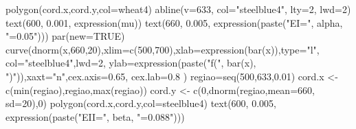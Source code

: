 \documentclass[
  letterpaper,
  DIV=11,
  numbers=noendperiod]{scrartcl}
\newenvironment{Shaded}{\begin{snugshade}}{\end{snugshade}}
\newcommand{\AttributeTok}[1]{\textcolor[rgb]{0.40,0.45,0.13}{#1}}
\newcommand{\ConstantTok}[1]{\textcolor[rgb]{0.56,0.35,0.01}{#1}}
\newcommand{\DecValTok}[1]{\textcolor[rgb]{0.68,0.00,0.00}{#1}}
\newcommand{\FloatTok}[1]{\textcolor[rgb]{0.68,0.00,0.00}{#1}}
\newcommand{\FunctionTok}[1]{\textcolor[rgb]{0.28,0.35,0.67}{#1}}
\newcommand{\NormalTok}[1]{\textcolor[rgb]{0.00,0.23,0.31}{#1}}
\newcommand{\OtherTok}[1]{\textcolor[rgb]{0.00,0.23,0.31}{#1}}
\newcommand{\StringTok}[1]{\textcolor[rgb]{0.13,0.47,0.30}{#1}}
\begin{document}
\begin{Shaded}
\begin{Highlighting}[]
\FunctionTok{polygon}\NormalTok{(cord.x,cord.y,}\AttributeTok{col=}\StringTok{\textquotesingle{}wheat4\textquotesingle{}}\NormalTok{)}
\FunctionTok{abline}\NormalTok{(}\AttributeTok{v=}\DecValTok{633}\NormalTok{, }\AttributeTok{col=}\StringTok{"steelblue4"}\NormalTok{, }\AttributeTok{lty=}\DecValTok{2}\NormalTok{, }\AttributeTok{lwd=}\DecValTok{2}\NormalTok{)}
\FunctionTok{text}\NormalTok{(}\DecValTok{600}\NormalTok{, }\FloatTok{0.001}\NormalTok{, }\FunctionTok{expression}\NormalTok{(mu))}
\FunctionTok{text}\NormalTok{(}\DecValTok{660}\NormalTok{, }\FloatTok{0.005}\NormalTok{, }\FunctionTok{expression}\NormalTok{(}\FunctionTok{paste}\NormalTok{(}\StringTok{"EI="}\NormalTok{, alpha, }\StringTok{"=0.05"}\NormalTok{)))}
\FunctionTok{par}\NormalTok{(}\AttributeTok{new=}\ConstantTok{TRUE}\NormalTok{)}
\FunctionTok{curve}\NormalTok{(}\FunctionTok{dnorm}\NormalTok{(x,}\DecValTok{660}\NormalTok{,}\DecValTok{20}\NormalTok{),}\AttributeTok{xlim=}\FunctionTok{c}\NormalTok{(}\DecValTok{500}\NormalTok{,}\DecValTok{700}\NormalTok{),}\AttributeTok{xlab=}\FunctionTok{expression}\NormalTok{(}\FunctionTok{bar}\NormalTok{(x)),}\AttributeTok{type=}\StringTok{"l"}\NormalTok{,}
      \AttributeTok{col=}\StringTok{"steelblue4"}\NormalTok{,}\AttributeTok{lwd=}\DecValTok{2}\NormalTok{, }\AttributeTok{ylab=}\FunctionTok{expression}\NormalTok{(}\FunctionTok{paste}\NormalTok{(}\StringTok{"f("}\NormalTok{, }\FunctionTok{bar}\NormalTok{(x),}
      \StringTok{")"}\NormalTok{)),}\AttributeTok{xaxt=}\StringTok{"n"}\NormalTok{,}\AttributeTok{cex.axis=}\FloatTok{0.65}\NormalTok{, }\AttributeTok{cex.lab=}\FloatTok{0.8}\NormalTok{ ) }
\NormalTok{regiao}\OtherTok{=}\FunctionTok{seq}\NormalTok{(}\DecValTok{500}\NormalTok{,}\DecValTok{633}\NormalTok{,}\FloatTok{0.01}\NormalTok{)}
\NormalTok{cord.x }\OtherTok{\textless{}{-}} \FunctionTok{c}\NormalTok{(}\FunctionTok{min}\NormalTok{(regiao),regiao,}\FunctionTok{max}\NormalTok{(regiao))}
\NormalTok{cord.y }\OtherTok{\textless{}{-}} \FunctionTok{c}\NormalTok{(}\DecValTok{0}\NormalTok{,}\FunctionTok{dnorm}\NormalTok{(regiao,}\AttributeTok{mean=}\DecValTok{660}\NormalTok{, }\AttributeTok{sd=}\DecValTok{20}\NormalTok{),}\DecValTok{0}\NormalTok{)}
\FunctionTok{polygon}\NormalTok{(cord.x,cord.y,}\AttributeTok{col=}\StringTok{\textquotesingle{}steelblue4\textquotesingle{}}\NormalTok{)}
\FunctionTok{text}\NormalTok{(}\DecValTok{600}\NormalTok{, }\FloatTok{0.005}\NormalTok{, }\FunctionTok{expression}\NormalTok{(}\FunctionTok{paste}\NormalTok{(}\StringTok{"EII="}\NormalTok{, beta, }\StringTok{"=0.088"}\NormalTok{)))}
\end{Highlighting}
\end{Shaded}
\end{document}
